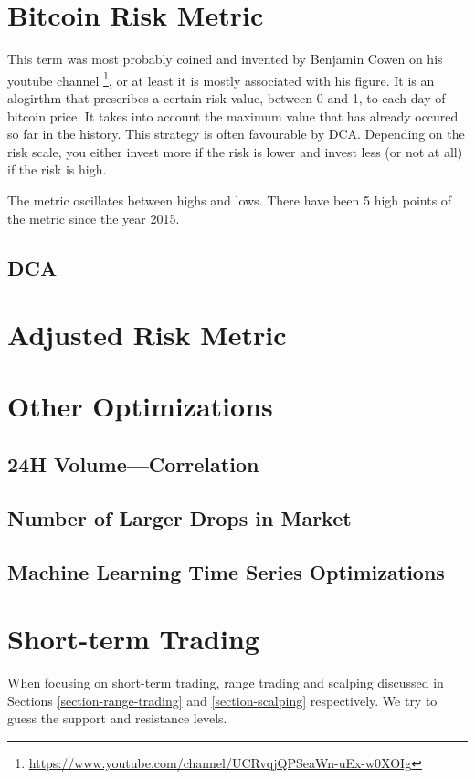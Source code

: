 \section{Bitcoin Risk Metric}
This term was most probably coined and invented by Benjamin Cowen on his youtube channel \footnote{\url{https://www.youtube.com/channel/UCRvqjQPSeaWn-uEx-w0XOIg}}, or at least it is mostly associated with his figure. It is an alogirthm that prescribes a certain risk value, between 0 and 1, to each day of bitcoin price. It takes into account the maximum value that has already occured so far in the history. This strategy is often favourable by DCA. Depending on the risk scale, you either invest more if the risk is lower and invest less (or not at all) if the risk is high.

The metric oscillates between highs and lows. There have been 5 high points of the metric since the year 2015.

\subsection*{DCA}
\label{DCA}

\section{Adjusted Risk Metric}

\section{Other Optimizations}

\subsection*{24H Volume---Correlation}

\subsection*{Number of Larger Drops in Market}

\subsection*{Machine Learning Time Series Optimizations}

\section{Short-term Trading}
When focusing on short-term trading, range trading and scalping discussed in Sections \ref{section-range-trading} and \ref{section-scalping} respectively. We try to guess the support and resistance levels.


